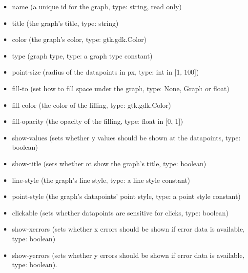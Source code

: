   \begin{itemize}
  \setlength{\parskip}{0.6ex}
    \item name (a unique id for the graph, type: string, read only)

    \item title (the graph's title, type: string)

    \item color (the graph's color, type: gtk.gdk.Color)

    \item type (graph type, type: a graph type constant)

    \item point-size (radius of the datapoints in px, type: int in [1, 100])

    \item fill-to (set how to fill space under the graph, type: None, Graph or 
      float)

    \item fill-color (the color of the filling, type: gtk.gdk.Color)

    \item fill-opacity (the opacity of the filling, type: float in [0, 1])

    \item show-values (sets whether y values should be shown at the datapoints,
      type: boolean)

    \item show-title (sets whether ot show the graph's title, type: boolean)

    \item line-style (the graph's line style, type: a line style constant)

    \item point-style (the graph's datapoints' point style, type: a point style
      constant)

    \item clickable (sets whether datapoints are sensitive for clicks, type: 
      boolean)

    \item show-xerrors (sets whether x errors should be shown if error data is 
      available, type: boolean)

    \item show-yerrors (sets whether y errors should be shown if error data is 
      available, type: boolean).

  \end{itemize}

